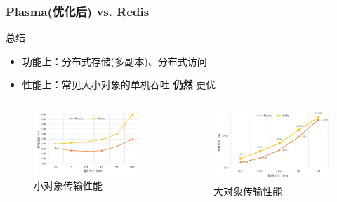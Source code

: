 \begin{frame}
	\frametitle{Plasma(优化后) vs. Redis}

	\begin{block}{总结}
		\begin{itemize}
			\item 功能上：分布式存储(多副本)、分布式访问
			\item 性能上：常见大小对象的单机吞吐 \textbf{仍然} 更优
		\end{itemize}
	\end{block}

	\vspace{-1em}
	\begin{columns}[t]
		\begin{figure}
			\centering
			\includegraphics[width=\textwidth]{image/chap04/redis_small.png}
			\caption{小对象传输性能}
		\end{figure}
		
		\begin{figure}
			\centering
			\includegraphics[width=\textwidth]{image/chap04/redis_big.png}
			\caption{大对象传输性能}
		\end{figure}
	\end{columns}
\end{frame}